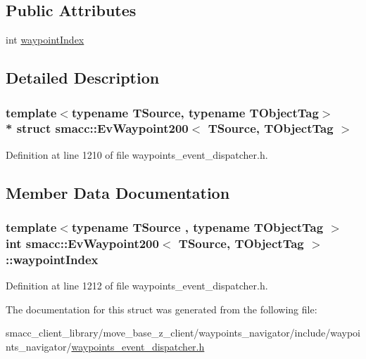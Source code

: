 \subsection*{Public Attributes}
\begin{DoxyCompactItemize}
\item 
int \hyperlink{structsmacc_1_1EvWaypoint200_a5a482a67596d3e90e821906467411945}{waypoint\+Index}
\end{DoxyCompactItemize}


\subsection{Detailed Description}
\subsubsection*{template$<$typename T\+Source, typename T\+Object\+Tag$>$\\*
struct smacc\+::\+Ev\+Waypoint200$<$ T\+Source, T\+Object\+Tag $>$}



Definition at line 1210 of file waypoints\+\_\+event\+\_\+dispatcher.\+h.



\subsection{Member Data Documentation}
\subsubsection[{\texorpdfstring{waypoint\+Index}{waypointIndex}}]{\setlength{\rightskip}{0pt plus 5cm}template$<$typename T\+Source , typename T\+Object\+Tag $>$ int {\bf smacc\+::\+Ev\+Waypoint200}$<$ T\+Source, T\+Object\+Tag $>$\+::waypoint\+Index}\hypertarget{structsmacc_1_1EvWaypoint200_a5a482a67596d3e90e821906467411945}{}\label{structsmacc_1_1EvWaypoint200_a5a482a67596d3e90e821906467411945}


Definition at line 1212 of file waypoints\+\_\+event\+\_\+dispatcher.\+h.



The documentation for this struct was generated from the following file\+:\begin{DoxyCompactItemize}
\item 
smacc\+\_\+client\+\_\+library/move\+\_\+base\+\_\+z\+\_\+client/waypoints\+\_\+navigator/include/waypoints\+\_\+navigator/\hyperlink{waypoints__event__dispatcher_8h}{waypoints\+\_\+event\+\_\+dispatcher.\+h}\end{DoxyCompactItemize}
